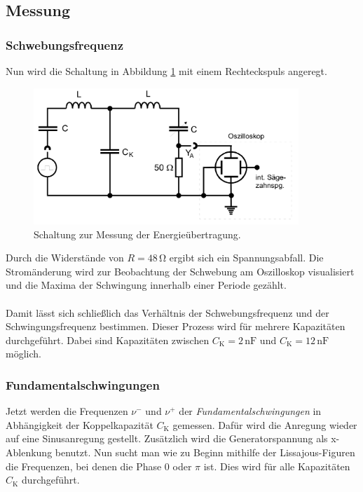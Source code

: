 \subsection{Messung}
\subsubsection*{Schwebungsfrequenz}

Nun wird die Schaltung in Abbildung \ref{fig:schwebeschaltung} mit einem Rechteckspuls angeregt.

\begin{figure} [H]
    \centering
    \includegraphics[width=10cm] {pictures/schwebeschaltung.png} 
    \caption{Schaltung zur Messung der Energieübertragung. \cite{v355}}
    \label{fig:schwebeschaltung}
\end{figure} 

Durch die Widerstände von $R = 48 \,\unit{\ohm}$ ergibt sich ein Spannungsabfall.
Die Stromänderung wird zur Beobachtung der Schwebung am Oszilloskop visualisiert und
die Maxima der Schwingung innerhalb einer Periode gezählt.\\
\\
Damit lässt sich schließlich das Verhältnis der Schwebungsfrequenz und der Schwingungsfrequenz bestimmen.
Dieser Prozess wird für mehrere Kapazitäten durchgeführt.
Dabei sind Kapazitäten zwischen $C_{\text{K}} = 2 \,\unit{\nano\farad}$ und $C_{\text{K}} = 12 \,\unit{\nano\farad}$ möglich.

\subsubsection*{Fundamentalschwingungen}

Jetzt werden die Frequenzen $\nu^{-}$ und $\nu^{+}$ der \textit{Fundamentalschwingungen} in 
Abhängigkeit der Koppelkapazität $C_{\text{K}}$ gemessen.
Dafür wird die Anregung wieder auf eine Sinusanregung gestellt.
Zusätzlich wird die Generatorspannung als x-Ablenkung benutzt.
Nun sucht man wie zu Beginn mithilfe der Lissajous-Figuren die Frequenzen, bei denen die Phase 0 oder $\pi$ ist.
Dies wird für alle Kapazitäten $C_{\text{K}}$ durchgeführt.

